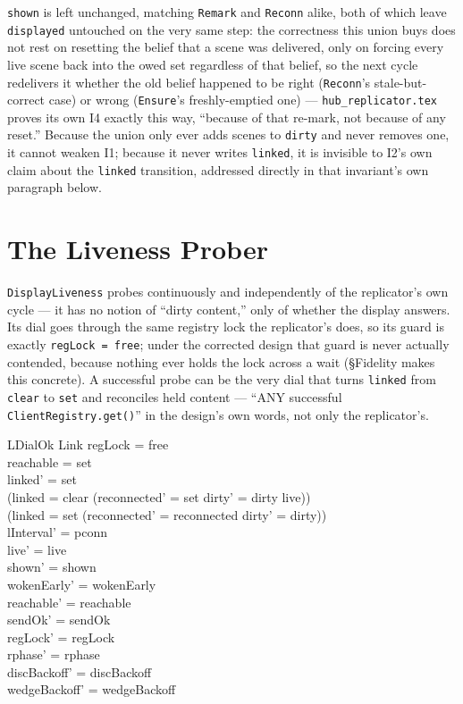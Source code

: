 \documentclass[a4paper,10pt,fleqn]{article}
\begin{document}
\texttt{shown} is left unchanged, matching \texttt{Remark} and
\texttt{Reconn} alike, both of which leave \texttt{displayed} untouched on
the very same step: the correctness this union buys does not rest on
resetting the belief that a scene was delivered, only on forcing every
live scene back into the owed set regardless of that belief, so the next
cycle redelivers it whether the old belief happened to be right
(\texttt{Reconn}'s stale-but-correct case) or wrong (\texttt{Ensure}'s
freshly-emptied one) --- \texttt{hub\_replicator.tex} proves its own I4
exactly this way, ``because of that re-mark, not because of any reset.''
Because the union only ever adds scenes to \texttt{dirty} and never
removes one, it cannot weaken I1; because it never writes \texttt{linked},
it is invisible to I2's own claim about the \texttt{linked} transition,
addressed directly in that invariant's own paragraph below.

\section{The Liveness Prober}

\texttt{DisplayLiveness} probes continuously and independently of the
replicator's own cycle --- it has no notion of ``dirty content,'' only of
whether the display answers.  Its dial goes through the same registry lock
the replicator's does, so its guard is exactly \texttt{regLock = free};
under the corrected design that guard is never actually contended, because
nothing ever holds the lock across a wait (\S Fidelity makes this concrete).
A successful probe can be the very dial that turns \texttt{linked} from
\texttt{clear} to \texttt{set} and reconciles held content --- ``ANY
successful \texttt{ClientRegistry.get()}'' in the design's own words, not
only the replicator's.

\begin{schema}{LDialOk}
  \Delta Link
\where
  regLock = free \\
  reachable = set \\
  linked' = set \\
  (linked = clear \implies
    (reconnected' = set \land dirty' = dirty \cup live)) \\
  (linked = set \implies
    (reconnected' = reconnected \land dirty' = dirty)) \\
  lInterval' = pconn \\
  live' = live \\ shown' = shown \\ wokenEarly' = wokenEarly \\
  reachable' = reachable \\ sendOk' = sendOk \\ regLock' = regLock \\
  rphase' = rphase \\
  discBackoff' = discBackoff \\ wedgeBackoff' = wedgeBackoff
\end{schema}
\end{document}
